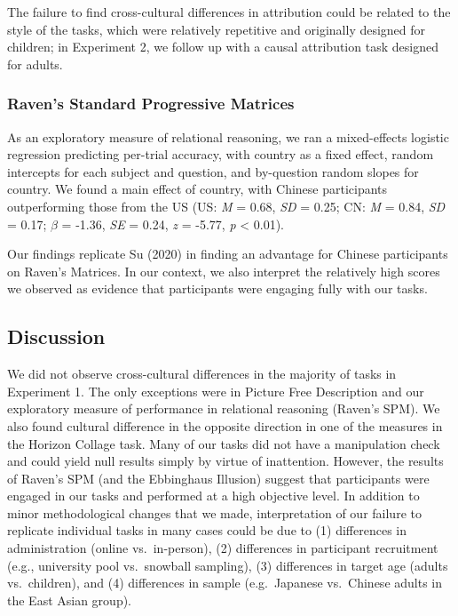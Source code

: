 \documentclass[
  man,floatsintext]{apa6}
\begin{document}
The failure to find cross-cultural differences in attribution could be related to the style of the tasks, which were relatively repetitive and originally designed for children; in Experiment 2, we follow up with a causal attribution task designed for adults.

\hypertarget{ravens-standard-progressive-matrices-1}{%
\subsubsection{Raven's Standard Progressive Matrices}\label{ravens-standard-progressive-matrices-1}}

As an exploratory measure of relational reasoning, we ran a mixed-effects logistic regression predicting per-trial accuracy, with country as a fixed effect, random intercepts for each subject and question, and by-question random slopes for country. We found a main effect of country, with Chinese participants outperforming those from the US (US: \emph{M} = 0.68, \emph{SD} = 0.25; CN: \emph{M} = 0.84, \emph{SD} = 0.17; \(\beta\) = -1.36, \emph{SE} = 0.24, \emph{z} = -5.77, \emph{p} \textless{} 0.01).

Our findings replicate Su (2020) in finding an advantage for Chinese participants on Raven's Matrices. In our context, we also interpret the relatively high scores we observed as evidence that participants were engaging fully with our tasks.

\hypertarget{discussion}{%
\subsection{Discussion}\label{discussion}}

We did not observe cross-cultural differences in the majority of tasks in Experiment 1. The only exceptions were in Picture Free Description and our exploratory measure of performance in relational reasoning (Raven's SPM). We also found cultural difference in the opposite direction in one of the measures in the Horizon Collage task. Many of our tasks did not have a manipulation check and could yield null results simply by virtue of inattention. However, the results of Raven's SPM (and the Ebbinghaus Illusion) suggest that participants were engaged in our tasks and performed at a high objective level. In addition to minor methodological changes that we made, interpretation of our failure to replicate individual tasks in many cases could be due to (1) differences in administration (online vs.~in-person), (2) differences in participant recruitment (e.g., university pool vs.~snowball sampling), (3) differences in target age (adults vs.~children), and (4) differences in sample (e.g.~Japanese vs.~Chinese adults in the East Asian group).
\end{document}
